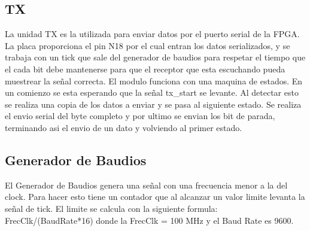\subsection{TX}
La unidad TX es la utilizada para enviar datos por el puerto serial de la FPGA. La placa proporciona el pin N18 por el cual entran los datos serializados, y se trabaja con un tick que sale del generador de baudios para respetar el tiempo que el cada bit debe mantenerse para que el receptor que esta escuchando pueda muestrear la señal correcta.
El modulo funciona con una maquina de estados. En un comienzo se esta esperando que la señal tx_start se levante. Al detectar esto se realiza una copia de los datos a enviar y se pasa al siguiente estado. Se realiza el envio serial del byte completo y por ultimo se envian los bit de parada, terminando asi el envio de un dato y volviendo al primer estado.  


\subsection{Generador de Baudios}
El Generador de Baudios genera una señal con una frecuencia menor a la del clock. Para hacer esto tiene un contador que al alcanzar un valor limite levanta la señal de tick. El limite se calcula con la siguiente formula: FrecClk/(BaudRate*16) donde la FrecClk = 100 MHz y el Baud Rate es 9600.